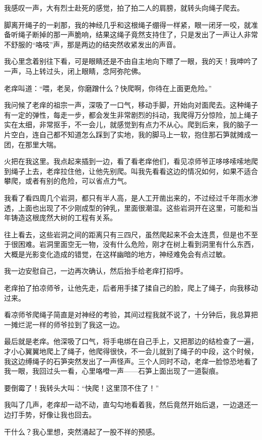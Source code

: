 我感叹一声，大有烈士赴死的感觉，拍了拍二人的肩膀，就转头向绳子爬去。

脚离开绳子的一刹那，我的神经几乎和这根绳子绷得一样紧，眼一闭牙一咬，就准备听绳子断掉的那一声脆响，结果这绳子竟然支持住了，只是发出了一声让人非常不舒服的“咯吱”声，那是两边的结突然收紧发出的声音。

我心里念着别往下看，可是眼睛还是不由自主地向下瞟了一眼，我的天！我呻吟了一声，马上转过头，闭上眼睛，念阿弥陀佛。

老痒叫道：“喂，老吴，你磨蹭什么？快爬啊，你待在上面更危险。”

我问候了老痒的祖宗一声，深吸了一口气，移动手脚，开始向对面爬去。这种绳子有一定的弹性，每走一步，都会发生非常剧烈的抖动，我爬得万分惊险，加上绳子实在太细，非常抠手，不一会儿，就感觉到有点力不从心。爬到后来，我的脑子一片空白，连自己都不知道怎么踩到了实地，我的脚马上一软，抱住那石笋就摊成一团，在那里大喘。

火把在我这里。我点起来插到一边，看了看老痒他们，看见凉师爷正哆哆嗦嗦地爬到绳子上去，老痒拉住他，让他先别爬。叫我先看看这边的情况如何，如果不适合攀爬，或者有别的危险，可以省点力气。

我看了看四周几个岩洞，都只有半人高，是人工开凿出来的，不过经过千年雨水渗透，上面也出现了不少刚成型的钟乳，里面很潮湿。这些岩洞开在这里，可能和当年铸造这根庞然大树的工程有关系。

往上看去，这些岩洞之间的距离只有三四尺，虽然爬起来不会太连贯，但是也不至于很困难。岩洞里面空无一物，没有什么危险，刚才在树上看到洞里有什么东西，大概是光影变化造成的错觉，在这样幽暗的地方，神经难免会有点过敏。

我一边安慰自己，一边再次确认，然后抬手给老痒打招呼。

老痒拍了拍凉师爷，让他先走，后者用手揉了揉自己的脸，爬上了绳子，向我移动过来。

看凉师爷爬绳子简直是对神经的考验，其间过程我就不说了，十分钟后，我总算把一摊烂泥一样的师爷拉到了我这一边。

最后就是老痒。他深吸了口气，将手电绑在自己手上，又把那边的结检查了一遍，才小心翼翼地爬上了绳子，他爬得很快，不一会儿就到了绳子的中段，这个时候，我这边缚绳子的石笋突然发出了一声怪声。三个人同时不动，老痒一脸惊恐地看了我一眼，我回过头一看，心里咯噔一声——石笋上面出现了一道裂痕。

要倒霉了！我转头大叫：“快爬！这里顶不住了！”

我叫了几声，老痒却一动不动，直勾勾地看着我，然后竟然开始后退，一边退还一边打手势，好像让我也回去。

干什么？我心里想，突然涌起了一股不祥的预感。

